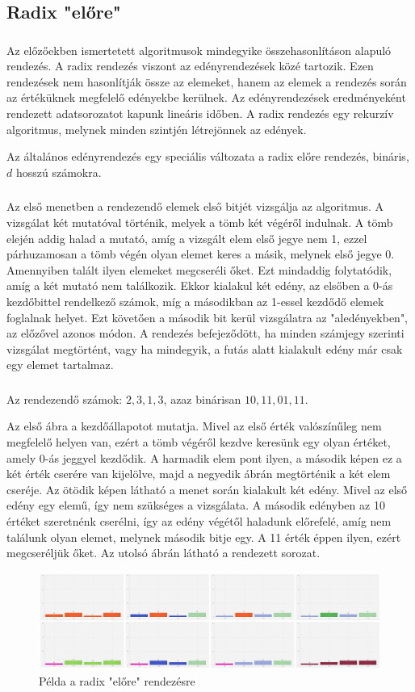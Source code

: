 \documentclass{elteikthesis}
\newcommand{\hiddensubsubsection}[1]{
	\stepcounter{subsubsection}
	\subsubsection*{\hspace{1em}{#1}}
}
\begin{document}
\subsection{Radix "előre"}
\hiddensubsubsection{Leírás}
Az előzőekben ismertetett algoritmusok mindegyike összehasonlításon alapuló rendezés. A radix rendezés viszont az edényrendezések közé tartozik. Ezen rendezések nem hasonlítják össze az elemeket, hanem az elemek a rendezés során az értéküknek megfelelő edényekbe kerülnek. Az edényrendezések eredményeként rendezett adatsorozatot kapunk lineáris időben\cite{Ronyai}. 
A radix rendezés egy rekurzív algoritmus, melynek minden szintjén létrejönnek az edények.\par
Az általános edényrendezés egy speciális változata a radix előre rendezés, bináris, $d$ hosszú számokra.\par
\hiddensubsubsection{Működés}
Az első menetben a rendezendő elemek első bitjét vizsgálja az algoritmus. A vizsgálat két mutatóval történik, melyek a tömb két végéről indulnak. A tömb elején addig halad a mutató, amíg a vizsgált elem első jegye nem 1, ezzel párhuzamosan a tömb végén olyan elemet keres a másik, melynek első jegye 0. Amennyiben talált ilyen elemeket megcseréli őket. Ezt mindaddig folytatódik, amíg a két mutató nem találkozik. Ekkor kialakul két edény, az elsőben a 0-ás kezdőbittel rendelkező számok, míg a másodikban az 1-essel kezdődő elemek foglalnak helyet. Ezt követően a második bit kerül vizsgálatra az "aledényekben", az előzővel azonos módon. A rendezés befejeződött, ha minden számjegy szerinti vizsgálat megtörtént, vagy ha mindegyik, a futás alatt kialakult edény már csak egy elemet tartalmaz.
 \hiddensubsubsection{Példa}
 Az rendezendő számok: $2, 3, 1, 3$, azaz binárisan $10, 11, 01, 11$.\par
 Az első ábra a kezdőállapotot mutatja. Mivel az első érték valószínűleg nem megfelelő helyen van, ezért a tömb végéről kezdve keresünk egy olyan értéket, amely 0-ás jeggyel kezdődik. A harmadik elem pont ilyen, a második képen ez a két érték cserére van kijelölve, majd a negyedik ábrán megtörténik a két elem cseréje. Az ötödik képen látható a menet során kialakult két edény. Mivel az első edény egy elemű, így nem szükséges a vizsgálata. A második edényben az 10 értéket szeretnénk cserélni, így az edény végétől haladunk előrefelé, amíg nem találunk olyan elemet, melynek második bitje egy. A 11 érték éppen ilyen, ezért megcseréljük őket. Az utolsó ábrán látható a rendezett sorozat.\par
 \begin{figure}[H]
 	\centering
 	\includegraphics[width=1\textwidth]{pics/radixforward.jpg}
 	\caption{Példa a radix "előre" rendezésre}
 \end{figure}\par
\end{document}
